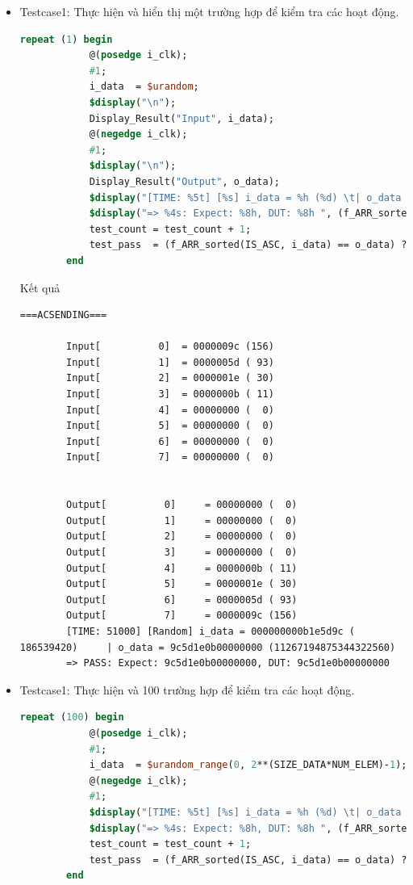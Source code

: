 \begin{itemize}[label=-]
	\item Testcase1: Thực hiện và hiển thị một trường hợp để kiểm tra các hoạt động.
	
	\begin{lstlisting}[style=StyleCode, language=SystemVerilog, caption={Test 1 trường hợp ngầu nhiên.}]
		repeat (1) begin
			@(posedge i_clk);
			#1;
			i_data  = $urandom;
			$display("\n");
			Display_Result("Input", i_data);
			@(negedge i_clk);
			#1;
			$display("\n");
			Display_Result("Output", o_data);
			$display("[TIME: %5t] [%s] i_data = %h (%d) \t| o_data = %h (%d)", $time, "Random", i_data, i_data, o_data, o_data);
			$display("=> %4s: Expect: %8h, DUT: %8h ", (f_ARR_sorted(IS_ASC, i_data) == o_data) ? "PASS" : "FAIL", f_ARR_sorted(IS_ASC, i_data), o_data);
			test_count = test_count + 1;
			test_pass  = (f_ARR_sorted(IS_ASC, i_data) == o_data) ? test_pass + 1 : test_pass;
		end
	\end{lstlisting}
	
	Kết quả
	
	\begin{lstlisting}[style=StyleResult, language=Result, caption={Kết quả khi cho 1 trường hợp ngầu nhiên.}]
		===ACSENDING===
		
		Input[          0] 	= 0000009c (156)
		Input[          1] 	= 0000005d ( 93)
		Input[          2] 	= 0000001e ( 30)
		Input[          3] 	= 0000000b ( 11)
		Input[          4] 	= 00000000 (  0)
		Input[          5] 	= 00000000 (  0)
		Input[          6] 	= 00000000 (  0)
		Input[          7] 	= 00000000 (  0)
		
		
		Output[          0] 	= 00000000 (  0)
		Output[          1] 	= 00000000 (  0)
		Output[          2] 	= 00000000 (  0)
		Output[          3] 	= 00000000 (  0)
		Output[          4] 	= 0000000b ( 11)
		Output[          5] 	= 0000001e ( 30)
		Output[          6] 	= 0000005d ( 93)
		Output[          7] 	= 0000009c (156)
		[TIME: 51000] [Random] i_data = 000000000b1e5d9c (           186539420) 	| o_data = 9c5d1e0b00000000 (11267194875344322560)
		=> PASS: Expect: 9c5d1e0b00000000, DUT: 9c5d1e0b00000000 
	\end{lstlisting}

	\item Testcase1: Thực hiện và 100 trường hợp để kiểm tra các hoạt động.
	
	\begin{lstlisting}[style=StyleCode, language=SystemVerilog, caption={Test 100 trường hợp ngầu nhiên.}]
		repeat (100) begin
			@(posedge i_clk);
			#1;
			i_data  = $urandom_range(0, 2**(SIZE_DATA*NUM_ELEM)-1);
			@(negedge i_clk);
			#1;
			$display("[TIME: %5t] [%s] i_data = %h (%d) \t| o_data = %h (%d)", $time, "Random", i_data, i_data, o_data, o_data);
			$display("=> %4s: Expect: %8h, DUT: %8h ", (f_ARR_sorted(IS_ASC, i_data) == o_data) ? "PASS" : "FAIL", f_ARR_sorted(IS_ASC, i_data), o_data);
			test_count = test_count + 1;
			test_pass  = (f_ARR_sorted(IS_ASC, i_data) == o_data) ? test_pass + 1 : test_pass;
		end
	\end{lstlisting}
	

\end{itemize}
